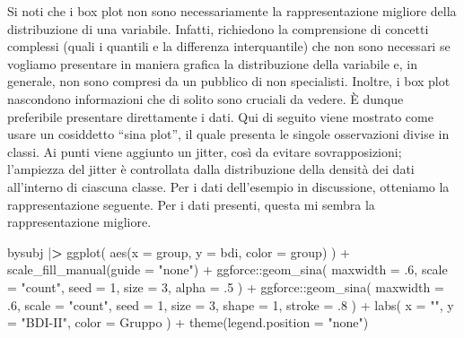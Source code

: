 \documentclass[
  10pt,
  italian,
  a4paper,
  extrafontsizes,onecolumn,openright
  ]{memoir}
\newenvironment{Shaded}{\begin{snugshade}}{\end{snugshade}}
\newcommand{\AttributeTok}[1]{\textcolor[rgb]{0.77,0.63,0.00}{#1}}
\newcommand{\DecValTok}[1]{\textcolor[rgb]{0.00,0.00,0.81}{#1}}
\newcommand{\ErrorTok}[1]{\textcolor[rgb]{0.64,0.00,0.00}{\textbf{#1}}}
\newcommand{\FunctionTok}[1]{\textcolor[rgb]{0.00,0.00,0.00}{#1}}
\newcommand{\NormalTok}[1]{#1}
\newcommand{\SpecialCharTok}[1]{\textcolor[rgb]{0.00,0.00,0.00}{#1}}
\newcommand{\StringTok}[1]{\textcolor[rgb]{0.31,0.60,0.02}{#1}}
\theoremstyle{definition}
\theoremstyle{definition}
\theoremstyle{definition}
\theoremstyle{definition}
\theoremstyle{remark}
\begin{document}
Si noti che i box plot non sono necessariamente la rappresentazione migliore della distribuzione di una variabile. Infatti, richiedono la comprensione di concetti complessi (quali i quantili e la differenza interquantile) che non sono necessari se vogliamo presentare in maniera grafica la distribuzione della variabile e, in generale, non sono compresi da un pubblico di non specialisti. Inoltre, i box plot nascondono informazioni che di solito sono cruciali da vedere. È dunque preferibile presentare direttamente i dati. Qui di seguito viene mostrato come usare un cosiddetto ``sina plot'', il quale presenta le singole osservazioni divise in classi. Ai punti viene aggiunto un jitter, così da evitare sovrapposizioni; l'ampiezza del jitter è controllata dalla distribuzione della densità dei dati all'interno di ciascuna classe. Per i dati dell'esempio in discussione, otteniamo la rappresentazione seguente. Per i dati presenti, questa mi sembra la rappresentazione migliore.

\begin{Shaded}
\begin{Highlighting}[]
\NormalTok{bysubj }\SpecialCharTok{|}\ErrorTok{\textgreater{}} 
  \FunctionTok{ggplot}\NormalTok{(}
    \FunctionTok{aes}\NormalTok{(}\AttributeTok{x =}\NormalTok{ group, }\AttributeTok{y =}\NormalTok{ bdi, }\AttributeTok{color =}\NormalTok{ group)}
\NormalTok{  ) }\SpecialCharTok{+}
  \FunctionTok{scale\_fill\_manual}\NormalTok{(}\AttributeTok{guide =} \StringTok{"none"}\NormalTok{) }\SpecialCharTok{+} 
\NormalTok{  ggforce}\SpecialCharTok{::}\FunctionTok{geom\_sina}\NormalTok{(}
    \AttributeTok{maxwidth =}\NormalTok{ .}\DecValTok{6}\NormalTok{, }\AttributeTok{scale =} \StringTok{"count"}\NormalTok{, }\AttributeTok{seed =} \DecValTok{1}\NormalTok{,}
    \AttributeTok{size =} \DecValTok{3}\NormalTok{, }\AttributeTok{alpha =}\NormalTok{ .}\DecValTok{5}
\NormalTok{  ) }\SpecialCharTok{+} 
\NormalTok{  ggforce}\SpecialCharTok{::}\FunctionTok{geom\_sina}\NormalTok{(}
    \AttributeTok{maxwidth =}\NormalTok{ .}\DecValTok{6}\NormalTok{, }\AttributeTok{scale =} \StringTok{"count"}\NormalTok{, }\AttributeTok{seed =} \DecValTok{1}\NormalTok{, }
    \AttributeTok{size =} \DecValTok{3}\NormalTok{, }\AttributeTok{shape =} \DecValTok{1}\NormalTok{, }\AttributeTok{stroke =}\NormalTok{ .}\DecValTok{8}
\NormalTok{  ) }\SpecialCharTok{+}
  \FunctionTok{labs}\NormalTok{(}
    \AttributeTok{x =} \StringTok{""}\NormalTok{,}
    \AttributeTok{y =} \StringTok{"BDI{-}II"}\NormalTok{,}
    \AttributeTok{color =} \StringTok{\textquotesingle{}Gruppo\textquotesingle{}}
\NormalTok{  ) }\SpecialCharTok{+} 
  \FunctionTok{theme}\NormalTok{(}\AttributeTok{legend.position =} \StringTok{"none"}\NormalTok{)}
\end{Highlighting}
\end{Shaded}
\end{document}
